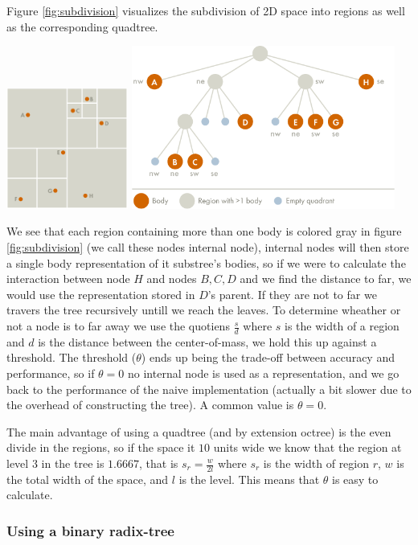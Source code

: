 Figure \ref{fig:subdivision} visualizes the subdivision of 2D space into regions
as well as the corresponding quadtree.
\begin{Figure}
  \centering
  \includegraphics[width=0.30\textwidth]{assests/example-space}
  \includegraphics[width=0.65\textwidth]{assests/example-tree}
  \label{fig:subdivision}
\end{Figure}
We see that each region containing more than one body is colored gray in figure
\ref{fig:subdivision} (we call these nodes internal node), internal nodes will
then store a single body representation of it substree's bodies, so if we were
to calculate the interaction between node
$H$ and nodes $B,C,D$ and we find the distance to far, we would use the
representation stored in $D$'s parent. If they are not to far we travers the tree
recursively untill we reach the leaves. To determine wheather or not a node is to
far away we use the quotiens $\frac{s}{d}$ where $s$ is the width of a region and
$d$ is the distance between the center-of-mass, we hold this up against a threshold.
The threshold ($\theta$) ends up being the trade-off between accuracy and performance,
so if $\theta = 0$ no internal node is used as a representation, and we go back
to the performance of the naive implementation (actually a bit slower due to the
overhead of constructing the tree). A common value is $\theta = 0$.

The main advantage of using a quadtree (and by extension octree) is the even
divide in the regions, so if the space it $10$ units wide we know that the region
at level $3$ in the tree is $1.6667$, that is $s_r=\frac{w}{2l}$ where $s_r$ is the
width of region $r$, $w$ is the total width of the space, and $l$ is the level.
This means that $\theta$ is easy to calculate.

\subsubsection{Using a binary radix-tree}